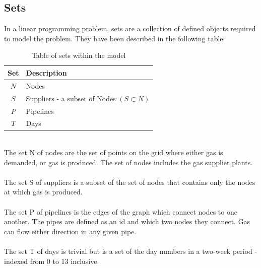 \documentclass{article}
\begin{document}
\subsection{Sets}
\bigskip
In a linear programming problem, sets are a collection of defined objects required to model the problem. They have been described in the following table:\\
\bigskip
\renewcommand\baselinestretch{1.5}
\begin{table}[h]
    \centering
    \color{black}
    \begin{tabular}{|c:l|}
        \hline
        \textbf{Set} & \textbf{Description} \\
        \hline
        \(N\) & Nodes \\ \hdashline
        \(S\) & Suppliers - a subset of Nodes \((S\subset N)\)\\ \hdashline
        \(P\) & Pipelines\\ \hdashline
        \(T\) & Days\\
        \hline
    \end{tabular}
    \caption{Table of sets within the model}
    \label{tab:sets}
\end{table}
\renewcommand\baselinestretch{1}\\
The set N of nodes are the set of points on the grid where either gas is demanded, or gas is produced. The set of nodes includes the gas supplier plants.\\
\\
The set S of suppliers is a subset of the set of nodes that contains only the nodes at which gas is produced.\\
\\
The set P of pipelines is the edges of the graph which connect nodes to one another. The pipes are defined as an id and which two nodes they connect. Gas can flow either direction in any given pipe.\\
\\
The set T of days is trivial but is a set of the day numbers in a two-week period - indexed from 0 to 13 inclusive.


\bigskip
\end{document}
